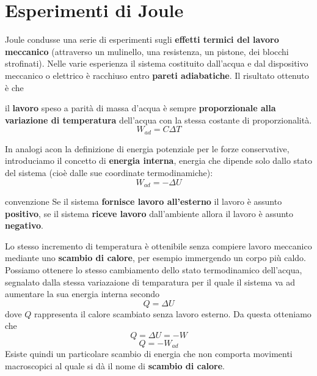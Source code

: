 \documentclass[x11names]{report}
\begin{document}
	
	\section{Esperimenti di Joule}
	Joule condusse una serie di esperimenti sugli\textbf{ effetti termici del lavoro meccanico} (attraverso un mulinello, una resistenza, un pistone, dei blocchi strofinati). Nelle varie esperienza il sistema costituito dall'acqua e dal dispositivo meccanico o elettrico è racchiuso entro \textbf{pareti adiabatiche}. Il risultato ottenuto è che 
	
	\begin{center}
		il \textbf{lavoro}  speso a parità di massa d'acqua è sempre \textbf{proporzionale alla variazione di temperatura} dell'acqua con la stessa costante di proporzionalità.
		\[ 
		W_{ad} = C\Delta T
		\]
	\end{center}
	In analogi acon la definizione di energia potenziale per le forze conservative, introduciamo il concetto di \textbf{energia interna}, energia che dipende solo dallo stato del sistema (cioè dalle sue coordinate termodinamiche):
	\[ 
	W_{ad} = -\Delta U 
	\]
	\begin{es}{convenzione}
		Se il sistema \textbf{fornisce lavoro all'esterno} il lavoro è assunto \textbf{positivo}, se il sistema \textbf{riceve lavoro} dall'ambiente allora il lavoro è assunto \textbf{negativo}.
	\end{es}
	Lo stesso incremento di temperatura è ottenibile senza compiere lavoro meccanico mediante uno \textbf{scambio di calore}, per esempio immergendo un corpo più caldo. Possiamo ottenere lo stesso cambiamento dello stato termodinamico dell'acqua, segnalato dalla stessa variazaione di temparatura per il quale il sistema va ad aumentare la sua energia interna secondo
	\[ 
	Q = \Delta U
	\]
	dove \(Q\) rappresenta il calore scambiato senza lavoro esterno. Da questa otteniamo che 
	\[ 
	Q = \Delta U = -W
	\]
	\begin{equation}\label{Mayer}
		Q = -W_{ad}
	\end{equation}
	Esiste quindi un particolare scambio di energia che non comporta movimenti macroscopici al quale si dà il nome di \textbf{scambio di calore}.
	
\end{document}
